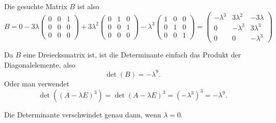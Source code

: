 \begin{loesung}
\begin{teilaufgaben}
Die gesuchte Matrix $B$ ist also
\[
B=0 -3\lambda \begin{pmatrix}
0&0&1\\
0&0&0\\
0&0&0
\end{pmatrix}
+3\lambda^2
\begin{pmatrix}
0&1&0\\
0&0&1\\
0&0&0
\end{pmatrix}
-\lambda^3\begin{pmatrix}1&0&0\\0&1&0\\0&0&1\end{pmatrix}
=\begin{pmatrix}
-\lambda^3& 3\lambda^2&-3\lambda\\
         0&- \lambda^3&3\lambda^3\\
         0&          0&- \lambda^3
\end{pmatrix}
\]
\item
Da $B$ eine Dreiecksmatrix ist, ist die Determinante einfach das Produkt
der Diagonalelemente, also
\[
\det(B)=-\lambda^9.
\]
Oder man verwendet
\[
\det((A-\lambda E)^3)
=
\det(A-\lambda E)^3=(-\lambda^3)^3=-\lambda^9.
\]
\item Die Determinante verschwindet genau dann, wenn $\lambda=0$.
\qedhere
\end{teilaufgaben}
\end{loesung}

